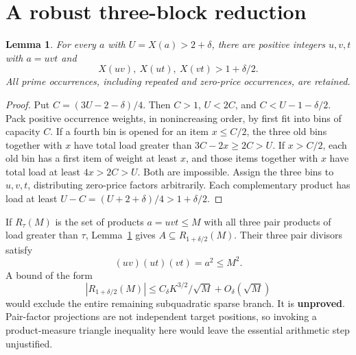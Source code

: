 \documentclass[a4paper,11pt]{article}
\newtheorem{lemma}[theorem]{Lemma}
\begin{document}
\section{A robust three-block reduction}
\begin{lemma}\label{lem:three}
For every $a$ with $U=X(a)>2+\delta$, there are positive integers $u,v,t$ with $a=uvt$ and
\[
 X(uv),\ X(ut),\ X(vt)>1+\delta/2.
\]
All prime occurrences, including repeated and zero-price occurrences, are retained.
\end{lemma}
\begin{proof}
Put $C=(3U-2-\delta)/4$. Then $C>1$, $U<2C$, and $C<U-1-\delta/2$. Pack positive occurrence weights, in nonincreasing order, by first fit into bins of capacity $C$. If a fourth bin is opened for an item $x\le C/2$, the three old bins together with $x$ have total load greater than $3C-2x\ge2C>U$. If $x>C/2$, each old bin has a first item of weight at least $x$, and those items together with $x$ have total load at least $4x>2C>U$. Both are impossible. Assign the three bins to $u,v,t$, distributing zero-price factors arbitrarily. Each complementary product has load at least $U-C=(U+2+\delta)/4>1+\delta/2$.
\end{proof}

If $R_\tau(M)$ is the set of products $a=uvt\le M$ with all three pair products of load greater than $\tau$, Lemma~\ref{lem:three} gives $A\subseteq R_{1+\delta/2}(M)$. Their three pair divisors satisfy
\[
 (uv)(ut)(vt)=a^2\le M^2.
\]
A bound of the form
\[
 |R_{1+\delta/2}(M)|
 \le C_\delta K^{3/2}/\sqrt M+O_\delta(\sqrt M)
\]
would exclude the entire remaining subquadratic sparse branch. It is \textbf{unproved}. Pair-factor projections are not independent target positions, so invoking a product-measure triangle inequality here would leave the essential arithmetic step unjustified.
\end{document}
